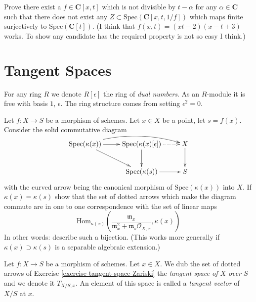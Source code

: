 \begin{exercise}
\label{exercise-no-quasi-section}
Prove there exist a $f \in \mathbf{C}[x, t]$ which is not divisible
by $t - \alpha$ for any $\alpha \in \mathbf{C}$ such that
there does not exist any $Z \subset \text{Spec}(\mathbf{C}[x, t, 1/f])$
which maps finite surjectively to $\text{Spec}(\mathbf{C}[t])$.
(I think that $f(x, t) = (xt - 2)(x - t + 3)$ works. To show any candidate
has the required property is not so easy I think.)
\end{exercise}


\section{Tangent Spaces}
\label{section-tangent-space}

\begin{definition}
\label{definition-dual-numbers}
For any ring $R$ we denote $R[\epsilon]$ the ring
of {\it dual numbers}. As an $R$-module it is free with
basis $1$, $\epsilon$. The ring structure comes from setting
$\epsilon^2 = 0$.
\end{definition}

\begin{exercise}
\label{exercise-tangent-space-Zariski}
Let $f : X \to S$ be a morphism of schemes.
Let $x \in X$ be a point, let $s = f(x)$.
Consider the solid commutative diagram
$$
\xymatrix{
\text{Spec}(\kappa(x)) \ar[r] \ar[dr] \ar@/^1pc/[rr] &
\text{Spec}(\kappa(x)[\epsilon]) \ar@{.>}[r] \ar[d]&
X \ar[d] \\
&
\text{Spec}(\kappa(s)) \ar[r] &
S
}
$$
with the curved arrow being the canonical morphism of
$\text{Spec}(\kappa(x))$ into $X$.
If $\kappa(x) = \kappa(s)$ show that the set of dotted
arrows which make the diagram commute are in one to one correspondence
with the set of linear maps
$$
\text{Hom}_{\kappa(x)}(
\frac{\mathfrak m_x}{\mathfrak m_x^2 + \mathfrak m_s\mathcal{O}_{X, x}},
\kappa(x))
$$
In other words: describe such a bijection.
(This works more generally if $\kappa(x) \supset \kappa(s)$ is a
separable algebraic extension.)
\end{exercise}

\begin{definition}
\label{definition-tangent-space}
Let $f : X \to S$ be a morphism of schemes.
Let $x \in X$. We dub the set of dotted arrows
of Exercise \ref{exercise-tangent-space-Zariski}
the {\it tangent space of $X$ over $S$}
and we denote it $T_{X/S, x}$. An element of this
space is called a {\it tangent vector} of $X/S$ at $x$.
\end{definition}

